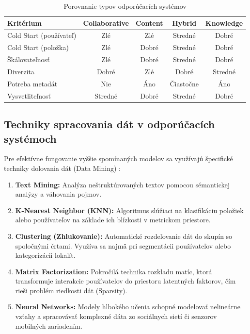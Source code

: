 \begin{table}[H]
\centering
\begin{tabular}{|l|c|c|c|c|}
\hline
\textbf{Kritérium} & \textbf{Collaborative} & \textbf{Content} & \textbf{Hybrid} & \textbf{Knowledge} \\
\hline
Cold Start (používateľ) & Zlé & Zlé & Stredné & Dobré \\
\hline
Cold Start (položka) & Zlé & Dobré & Stredné & Dobré \\
\hline
Škálovateľnosť & Zlé & Dobré & Stredné & Dobré \\
\hline
Diverzita & Dobré & Zlé & Dobré & Stredné \\
\hline
Potreba metadát & Nie & Áno & Čiastočne & Áno \\
\hline
Vysvetliteľnosť & Stredné & Dobré & Stredné & Dobré \\
\hline
\end{tabular}
\caption{Porovnanie typov odporúčacích systémov}
\end{table}

\subsection{Techniky spracovania dát v odporúčacích systémoch}
Pre efektívne fungovanie vyššie spomínaných modelov sa využívajú špecifické techniky dolovania dát (Data Mining) \cite{ko2022survey}:

\begin{enumerate}
    \item \textbf{Text Mining:} Analýza neštruktúrovaných textov pomocou sémantickej analýzy a váhovania pojmov.
    \item \textbf{K-Nearest Neighbor (KNN):} Algoritmus slúžiaci na klasifikáciu položiek alebo používateľov na základe ich blízkosti v metrickom priestore.
    \item \textbf{Clustering (Zhlukovanie):} Automatické rozdeľovanie dát do skupín so spoločnými črtami. Využíva sa najmä pri segmentácii používateľov alebo kategorizácii lokalít.
    \item \textbf{Matrix Factorization:} Pokročilá technika rozkladu matíc, ktorá transformuje interakcie používateľov do priestoru latentných faktorov, čím rieši problém riedkosti dát (Sparsity).
    \item \textbf{Neural Networks:} Modely hlbokého učenia schopné modelovať nelineárne vzťahy a spracovávať komplexné dáta zo sociálnych sietí či senzorov mobilných zariadením.
\end{enumerate}

